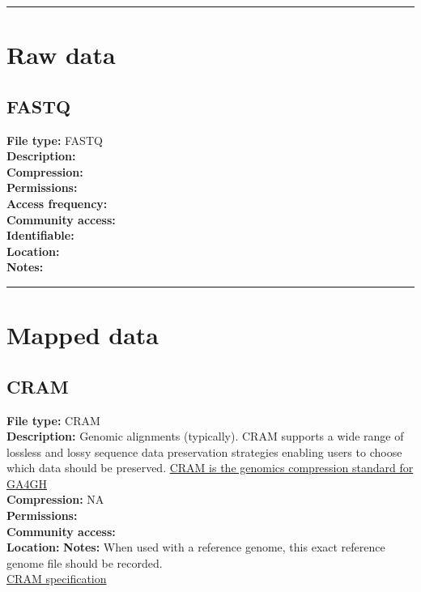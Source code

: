\documentclass[
]{book}
\begin{document}
\begin{center}\rule{0.5\linewidth}{0.5pt}\end{center}

\hypertarget{raw-data}{%
\section{Raw data}\label{raw-data}}

\hypertarget{fastq}{%
\subsection{FASTQ}\label{fastq}}

\textbf{File type:} FASTQ\\
\textbf{Description:}\\
\textbf{Compression:}\\
\textbf{Permissions:}\\
\textbf{Access frequency:}\\
\textbf{Community access:}\\
\textbf{Identifiable:}\\
\textbf{Location:}\\
\textbf{Notes:}

\begin{center}\rule{0.5\linewidth}{0.5pt}\end{center}

\hypertarget{mapped-data}{%
\section{Mapped data}\label{mapped-data}}

\hypertarget{cram-1}{%
\subsection{CRAM}\label{cram-1}}

\textbf{File type:} CRAM\\
\textbf{Description:} Genomic alignments (typically). CRAM supports a wide
range of lossless and lossy sequence data preservation strategies enabling users to choose which data should be preserved. \href{https://www.ga4gh.org/cram/}{CRAM is the genomics compression standard for GA4GH}\\
\textbf{Compression:} NA\\
\textbf{Permissions:}\\
\textbf{Community access:}\\
\textbf{Location:}
\textbf{Notes:} When used with a reference genome, this exact reference genome file should be recorded.\\
\href{https://samtools.github.io/hts-specs/CRAMv3.pdf}{CRAM specification}
\end{document}
